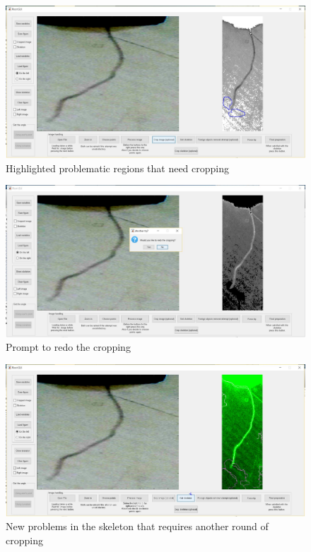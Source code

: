 \begin{figure}[H]
	\centering
	\includegraphics[width=\textwidth]{../Figures/manual/optionalC4.jpg}
	\caption{Highlighted problematic regions that need cropping}
	\label{fig:img49}
\end{figure}

\begin{figure}[H]
	\centering
	\includegraphics[width=\textwidth]{../Figures/manual/optionalC5.jpg}
	\caption{Prompt to redo the cropping}
	\label{fig:img50}
\end{figure}

\begin{figure}[H]
	\centering
	\includegraphics[width=\textwidth]{../Figures/manual/optionalC6.jpg}
	\caption{New problems in the skeleton that requires another round of cropping}
	\label{fig:img51}
\end{figure}

